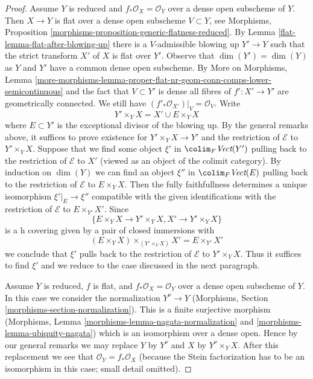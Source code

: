 \begin{proof}
\medskip\noindent
Assume $Y$ is reduced and $f_*\mathcal{O}_X = \mathcal{O}_Y$
over a dense open subscheme of $Y$.
Then $X \to Y$ is flat over a dense open
subscheme $V \subset Y$, see
Morphisms, Proposition \ref{morphisms-proposition-generic-flatness-reduced}.
By Lemma \ref{flat-lemma-flat-after-blowing-up}
there is a $V$-admissible blowing up $Y' \to Y$ such that
the strict transform $X'$ of $X$ is flat over $Y'$.
Observe that $\dim(Y') = \dim(Y)$ as $Y$ and $Y'$ have
a common dense open subscheme. By More on Morphisms, Lemma
\ref{more-morphisms-lemma-proper-flat-nr-geom-conn-comps-lower-semicontinuous}
and the fact that $V \subset Y'$ is dense
all fibres of $f' : X' \to Y'$ are geometrically connected.
We still have $(f'_*\mathcal{O}_{X'})|_V = \mathcal{O}_V$.
Write
$$
Y' \times_Y X = X' \cup E \times_Y X
$$
where $E \subset Y'$ is the exceptional divisor of the blowing up.
By the general remarks above, it suffices to prove existence
for $Y' \times_Y X \to Y'$ and the restriction of $\mathcal{E}$
to $Y' \times_Y X$.
Suppose that we find some object $\xi'$ in $\colim_F \textit{Vect}(Y')$
pulling back to the restriction of $\mathcal{E}$ to $X'$ (viewed
as an object of the colimit category).
By induction on $\dim(Y)$ we can find an object $\xi''$ in
$\colim_F \textit{Vect}(E)$ pulling back to the restriction of
$\mathcal{E}$ to $E \times_Y X$. Then the fully faithfullness
determines a unique isomorphism $\xi'|_E \to \xi''$
compatible with the given identifications with the restriction
of $\mathcal{E}$ to $E \times_{Y'} X'$. Since
$$
\{E \times_Y X \to Y' \times_Y X, X' \to Y' \times_Y X\}
$$
is a h covering given by a pair of closed immersions with
$$
(E \times_Y X) \times_{(Y' \times_Y X)} X' = E \times_{Y'} X'
$$
we conclude that $\xi'$ pulls back to the restriction of
$\mathcal{E}$ to $Y' \times_Y X$. Thus it suffices to find
$\xi'$ and we reduce to the case discussed in the next paragraph.

\medskip\noindent
Assume $Y$ is reduced, $f$ is flat, and $f_*\mathcal{O}_X = \mathcal{O}_Y$
over a dense open subscheme of $Y$. In this case we consider the
normalization $Y^\nu \to Y$ (Morphisms, Section
\ref{morphisms-section-normalization}). This is a finite surjective
morphism
(Morphisms, Lemma \ref{morphisms-lemma-nagata-normalization} and
\ref{morphisms-lemma-ubiquity-nagata}) which is an isomorphism
over a dense open. Hence by our general remarks we may
replace $Y$ by $Y^\nu$ and $X$ by $Y^\nu \times_Y X$.
After this replacement we see that $\mathcal{O}_Y = f_*\mathcal{O}_X$
(because the Stein factorization has to be an isomorphism
in this case; small detail omitted).


\end{proof}
